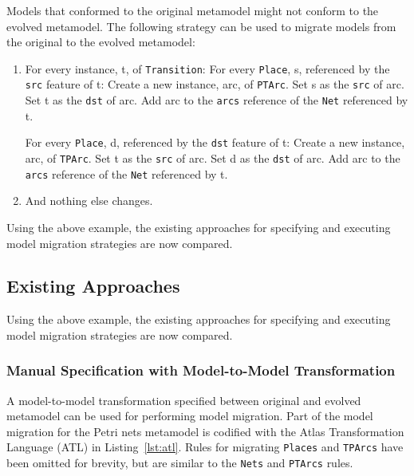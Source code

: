 Models that conformed to the original metamodel might not conform to the evolved metamodel. The following strategy can be used to migrate models from the original to the evolved metamodel:

\begin{enumerate}
	\item For every instance, t, of \texttt{Transition}: 
	\subitem For every \texttt{Place}, s, referenced by the \texttt{src} feature of t: 
	\subsubitem Create a new instance, arc, of \texttt{PTArc}. 
	\subsubitem Set s as the \texttt{src} of arc. 
	\subsubitem Set t as the \texttt{dst} of arc. 
	\subsubitem Add arc to the \texttt{arcs} reference of the \texttt{Net} referenced by t.
	
	\subitem For every \texttt{Place}, d, referenced by the \texttt{dst} feature of t: 
	\subsubitem Create a new instance, arc, of \texttt{TPArc}. 
	\subsubitem Set t as the \texttt{src} of arc. 
	\subsubitem Set d as the \texttt{dst} of arc. 
	\subsubitem Add arc to the \texttt{arcs} reference of the \texttt{Net} referenced by t.
	
	\item And nothing else changes.
\end{enumerate}

Using the above example, the existing approaches for specifying and executing model migration strategies are now compared.


\subsection{Existing Approaches}
Using the above example, the existing approaches for specifying and executing model migration strategies are now compared.

\subsubsection{Manual Specification with Model-to-Model Transformation}
\label{subsubsec:m2m}

A model-to-model transformation specified between original and evolved metamodel can be used for performing model migration. Part of the model migration for the Petri nets metamodel is codified with the Atlas Transformation Language (ATL) \cite{jouault05transforming} in Listing~\ref{lst:atl}. Rules for migrating \texttt{Places} and \texttt{TPArcs} have been omitted for brevity, but are similar to the \texttt{Nets} and \texttt{PTArcs} rules.

